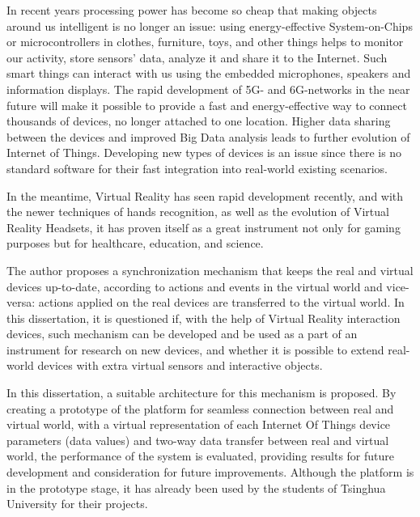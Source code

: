 \begin{abstract*}

  In recent years processing power has become so cheap that making objects around us intelligent is no longer an issue: using energy-effective System-on-Chips or microcontrollers in clothes, furniture, toys, and other things helps to monitor our activity, store sensors' data, analyze it and share it to the Internet. Such smart things can interact with us using the embedded microphones, speakers and information displays. The rapid development of 5G- and 6G-networks in the near future will make it possible to provide a fast and energy-effective way to connect thousands of devices, no longer attached to one location. Higher data sharing between the devices and improved Big Data analysis leads to further evolution of Internet of Things. Developing new types of devices is an issue since there is no standard software for  their fast integration into real-world existing scenarios.
   
  In the meantime, Virtual Reality has seen rapid development recently, and with the newer techniques of hands recognition, as well as the evolution of Virtual Reality Headsets, it has proven itself as a great instrument not only for gaming purposes but for healthcare, education, and science.
   
  The author proposes a synchronization mechanism that keeps the real and virtual devices up-to-date, according to actions and events in the virtual world and vice-versa: actions applied on the real devices are transferred to the virtual world. In this dissertation, it is questioned if, with the help of Virtual Reality interaction devices, such mechanism can be developed and be used as a part of an instrument for research on new devices, and whether it is possible to extend real-world devices with extra virtual sensors and interactive objects.
  
  In this dissertation, a suitable architecture for this mechanism is proposed. By creating a prototype of the platform for seamless connection between real and virtual world, with a virtual representation of each Internet Of Things device parameters (data values) and two-way data transfer between real and virtual world, the performance of the system is evaluated, providing results for future development and consideration for future improvements. Although the platform is in the prototype stage, it has already been used by the students of Tsinghua University for their projects. 
  
  
 


\end{abstract*}
